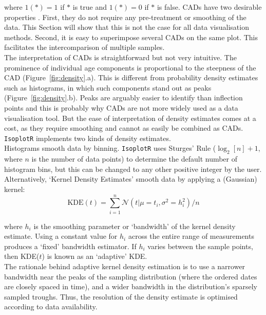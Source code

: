 \begin{refsection}
\noindent where $1(\ast) = 1$ if $\ast$ is true and $1(\ast) = 0$ if
$\ast$ is false. CADs have two desirable properties
\citep{vermeesch2007a}.  First, they do not require any pre-treatment
or smoothing of the data.  This Section will show that this is not the
case for all data visualisation methods. Second, it is easy to
superimpose several CADs on the same plot. This facilitates the
intercomparison of multiple samples.\\

The interpretation of CADs is straightforward but not very
intuitive. The prominence of individual age components is proportional
to the steepness of the CAD (Figure~\ref{fig:density}.a). This is
different from probability density estimates such as histograms, in
which such components stand out as peaks
(Figure~\ref{fig:density}.b). Peaks are arguably easier to identify
than inflection points and this is probably why CADs are not more
widely used as a data visualisation tool. But the ease of
interpretation of density estimates comes at a cost, as they require
smoothing and cannot as easily be combined as CADs. \texttt{IsoplotR}
implements two kinds of density estimates.\\

Histograms smooth data by binning. \texttt{IsoplotR} uses Sturges'
Rule ($\log_2[n]+1$, where $n$ is the number of data points) to
determine the default number of histogram bins, but this can be
changed to any other positive integer by the user. Alternatively,
`Kernel Density Estimates' \citep[KDEs][]{vermeesch2012b} smooth data
by applying a (Gaussian) kernel:
\begin{equation}
  \mathrm{KDE}(t) = \sum_{i=1}^{n}\mathcal{N}\left(t | \mu=t_i,
  \sigma^2=h_i^2\right)/n
  \label{eq:KDE}
\end{equation}

\noindent where $h_i$ is the smoothing parameter or `bandwidth' of the
kernel density estimate. Using a constant value for $h_i$ across the
entire range of measurements produces a `fixed' bandwidth estimator.
If $h_i$ varies between the sample points, then KDE($t$) is known as
an `adaptive' KDE.\\

The rationale behind adaptive kernel density estimation is to use a
narrower bandwidth near the peaks of the sampling distribution (where
the ordered dates are closely spaced in time), and a wider bandwidth
in the distribution's sparsely sampled troughs. Thus, the resolution
of the density estimate is optimised according to data
availability.\\


\end{refsection}
